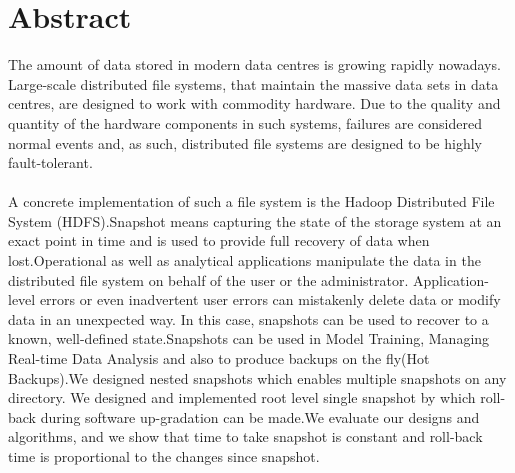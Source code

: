 









\chapter*{Abstract}
\thispagestyle{empty}
The amount of data stored in modern data centres is growing rapidly nowadays.
Large-scale distributed file systems, that maintain the massive data sets in data
centres, are designed to work with commodity hardware. Due to the quality and
quantity of the hardware components in such systems, failures are considered
normal events and, as such, distributed file systems are designed to be highly
fault-tolerant. \\\\
\hspace{4em}     A concrete implementation of such a file system is the Hadoop Distributed File
System (HDFS).Snapshot means capturing the state of the storage system at an exact point in time and is used to provide full recovery of data when lost.Operational as well as analytical applications manipulate the data in the distributed file system on behalf of the user or the administrator. Application-level errors or even inadvertent user errors can mistakenly delete data or modify data in an unexpected way. In this case, snapshots can be used to recover to a known, well-defined state.Snapshots can be used in Model Training, Managing Real-time Data Analysis and also to produce backups on the fly(Hot Backups).We designed nested snapshots which enables multiple snapshots on any directory. We designed and implemented root level single snapshot by which roll-back during software up-gradation can be made.We evaluate our designs and algorithms, and we show that time to take snapshot is constant and roll-back time is proportional to the changes since snapshot.


\newpage


